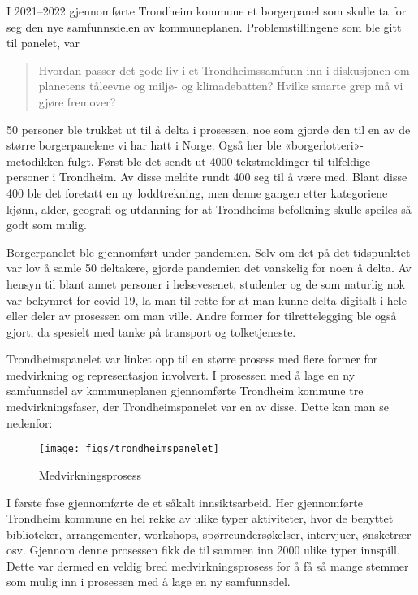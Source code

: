 \documentclass[
  12pt,
  a4paper, 12pt]{article}
\begin{document}
I 2021--2022 gjennomførte Trondheim kommune et borgerpanel som skulle ta for seg den nye samfunnsdelen av kommuneplanen. Problemstillingene som ble gitt til panelet, var

\begin{quote}
Hvordan passer det gode liv i et Trondheimssamfunn inn i diskusjonen om planetens tåleevne og miljø- og klimadebatten? Hvilke smarte grep må vi gjøre fremover?
\end{quote}

50 personer ble trukket ut til å delta i prosessen, noe som gjorde den til en av de større borgerpanelene vi har hatt i Norge. Også her ble «borgerlotteri»-metodikken fulgt. Først ble det sendt ut 4000 tekstmeldinger til tilfeldige personer i Trondheim. Av disse meldte rundt 400 seg til å være med. Blant disse 400 ble det foretatt en ny loddtrekning, men denne gangen etter kategoriene kjønn, alder, geografi og utdanning for at Trondheims befolkning skulle speiles så godt som mulig.

Borgerpanelet ble gjennomført under pandemien. Selv om det på det tidspunktet var lov å samle 50 deltakere, gjorde pandemien det vanskelig for noen å delta. Av hensyn til blant annet personer i helsevesenet, studenter og de som naturlig nok var bekymret for covid-19, la man til rette for at man kunne delta digitalt i hele eller deler av prosessen om man ville. Andre former for tilrettelegging ble også gjort, da spesielt med tanke på transport og tolketjeneste.

Trondheimspanelet var linket opp til en større prosess med flere former for medvirkning og representasjon involvert. I prosessen med å lage en ny samfunnsdel av kommuneplanen gjennomførte Trondheim kommune tre medvirkningsfaser, der Trondheimspanelet var en av disse. Dette kan man se nedenfor:

\begin{figure}

{\centering \texttt{[image: figs/trondheimspanelet]} 

}

\caption{Medvirkningsprosess}\label{fig:unnamed-chunk-4}
\end{figure}

I første fase gjennomførte de et såkalt innsiktsarbeid. Her gjennomførte Trondheim kommune en hel rekke av ulike typer aktiviteter, hvor de benyttet biblioteker, arrangementer, workshops, spørreundersøkelser, intervjuer, ønsketrær osv. Gjennom denne prosessen fikk de til sammen inn 2000 ulike typer innspill. Dette var dermed en veldig bred medvirkningsprosess for å få så mange stemmer som mulig inn i prosessen med å lage en ny samfunnsdel.
\end{document}
